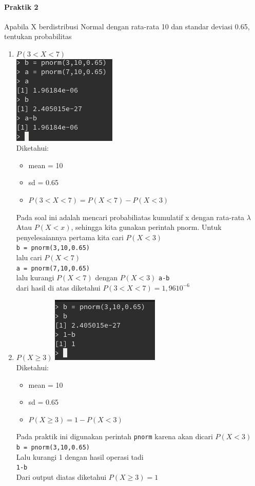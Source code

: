 \documentclass[a4paper,12pt]{article}
\begin{document}
\begin{enumerate}[label=\textbf{\Alph*.}]
\paragraph{Praktik 2\\}
Apabila X berdistribusi Normal dengan rata-rata 10 dan standar deviasi 0.65, tentukan probabilitas 
\begin{enumerate}
	\item $P(3 < X < 7)$\\
	\includegraphics{praka2a}\\
	Diketahui:
	\begin{itemize}
		\item mean = 10
		\item sd = 0.65 
		\item $P(3 < X < 7) = P(X < 7) - P(X < 3)$ 
	\end{itemize}
	Pada soal ini adalah mencari probabiliatas kumulatif x  dengan rata-rata $\lambda$
	Atau $P(X < x)$, sehingga kita gunakan perintah pnorm.
	Untuk penyelesaiannya pertama kita cari $P(X < 3)$\\
	\texttt{b = pnorm(3,10,0.65)}\\
	lalu cari $P(X < 7)$\\
	\texttt{a = pnorm(7,10,0.65)}\\
	lalu kurangi $P(X < 7)$ dengan $P(X < 3)$
	\texttt{a-b}\\
	dari hasil di atas diketahui $P(3 < X < 7) = 1,9610^{-6}$

    \item $P(X \geq 3)$
        \includegraphics{praka2b}\\
        Diketahui:
        \begin{itemize}
            \item mean = 10
            \item sd = 0.65 
            \item $P(X \geq 3) = 1 - P(X < 3)$ 
        \end{itemize} 
        Pada praktik ini digunakan perintah \texttt{pnorm} karena akan dicari $P(X < 3)$\\
        \texttt{b = pnorm(3,10,0.65)}\\
        Lalu kurangi 1 dengan hasil operasi tadi\\
        \texttt{1-b}\\
        Dari output diatas diketahui $P(X \geq 3) = 1$ 


\end{enumerate}
\end{enumerate}
\end{document}
